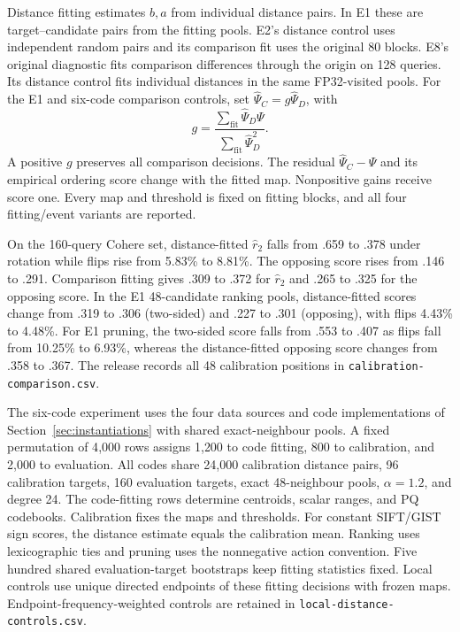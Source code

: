 Distance fitting estimates $b,a$ from individual distance pairs. In E1 these are target--candidate pairs from the fitting pools. E2's distance control uses independent random pairs and its comparison fit uses the original 80 blocks. E8's original diagnostic fits comparison differences through the origin on 128 queries. Its distance control fits individual distances in the same FP32-visited pools. For the E1 and six-code comparison controls, set $\widehat\Psi_C=g\widehat\Psi_D$, with
\begin{equation}
g=\frac{\sum_{\mathrm{fit}}\widehat\Psi_D\Psi}{\sum_{\mathrm{fit}}\widehat\Psi_D^2}.
\end{equation}
A positive $g$ preserves all comparison decisions. The residual $\widehat\Psi_C-\Psi$ and its empirical ordering score change with the fitted map. Nonpositive gains receive score one. Every map and threshold is fixed on fitting blocks, and all four fitting/event variants are reported.

On the 160-query Cohere set, distance-fitted $\widehat r_2$ falls from .659 to .378 under rotation while flips rise from 5.83\% to 8.81\%. The opposing score rises from .146 to .291. Comparison fitting gives .309 to .372 for $\widehat r_2$ and .265 to .325 for the opposing score. In the E1 48-candidate ranking pools, distance-fitted scores change from .319 to .306 (two-sided) and .227 to .301 (opposing), with flips 4.43\% to 4.48\%. For E1 pruning, the two-sided score falls from .553 to .407 as flips fall from 10.25\% to 6.93\%, whereas the distance-fitted opposing score changes from .358 to .367. The release records all 48 calibration positions in \texttt{calibration-comparison.csv}.

The six-code experiment uses the four data sources and code implementations of Section~\ref{sec:instantiations} with shared exact-neighbour pools. A fixed permutation of 4{,}000 rows assigns 1{,}200 to code fitting, 800 to calibration, and 2{,}000 to evaluation. All codes share 24{,}000 calibration distance pairs, 96 calibration targets, 160 evaluation targets, exact 48-neighbour pools, $\alpha=1.2$, and degree 24. The code-fitting rows determine centroids, scalar ranges, and PQ codebooks. Calibration fixes the maps and thresholds. For constant SIFT/GIST sign scores, the distance estimate equals the calibration mean. Ranking uses lexicographic ties and pruning uses the nonnegative action convention. Five hundred shared evaluation-target bootstraps keep fitting statistics fixed. Local controls use unique directed endpoints of these fitting decisions with frozen maps. Endpoint-frequency-weighted controls are retained in \texttt{local-distance-controls.csv}.

